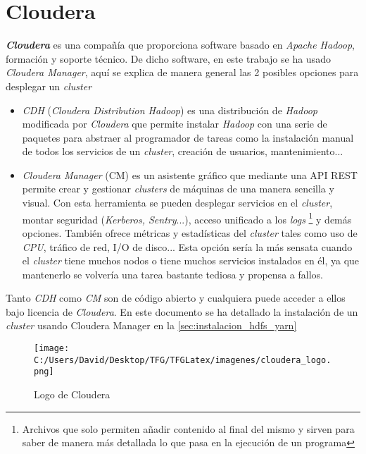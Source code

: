 \chapter{Cloudera}\label{apendix:cloudera}
\textbf{\textit{Cloudera}} es una compañía que proporciona software basado en 
\textit{Apache Hadoop}, formación y soporte técnico. 
De dicho software, en este trabajo se ha usado \textit{Cloudera Manager}, aquí se explica de manera general 
las 2 posibles opciones para desplegar un \textit{cluster}
\begin{itemize}
  \item \textit{CDH} (\textit{Cloudera Distribution Hadoop}) es una distribución de 
  \textit{Hadoop} modificada por \textit{Cloudera} que permite instalar \textit{Hadoop} con una serie 
  de paquetes para abstraer al programador de tareas como la instalación manual de todos los servicios 
  de un \textit{cluster}, creación de usuarios, mantenimiento...
  
  \item \textit{Cloudera Manager} (CM) es un asistente gráfico que mediante 
  una API REST permite crear  y gestionar \textit{clusters} de máquinas de una manera sencilla 
  y visual. Con esta herramienta se pueden desplegar servicios en el \textit{cluster}, montar seguridad 
  (\textit{Kerberos, Sentry}...), acceso unificado a los \textit{logs}
  \footnote{Archivos que solo permiten añadir contenido al final del mismo y sirven para saber de manera 
  más detallada lo que pasa en la ejecución de un programa} y demás opciones.
  También ofrece métricas y estadísticas del \textit{cluster} tales como uso de 
  \textit{CPU}, tráfico de red, I/O de disco...
  Esta opción sería la más sensata cuando el \textit{cluster} tiene muchos nodos o tiene muchos servicios
  instalados en él, ya que mantenerlo se volvería una tarea bastante tediosa y propensa a fallos.
\end{itemize}

Tanto \textit{CDH} como \textit{CM} son de código abierto y cualquiera puede acceder a ellos 
bajo licencia de \textit{Cloudera}.
En este documento se ha detallado la instalación de un \textit{cluster} usando Cloudera Manager en la
\autoref{sec:instalacion_hdfs_yarn}

\begin{figure}[!htpb]
  \centering
  \texttt{[image: C:/Users/David/Desktop/TFG/TFGLatex/imagenes/cloudera\_logo.png]}
  \caption[Logo de Cloudera]{Logo de Cloudera}
  \label{cloudera_manager}
\end{figure}

